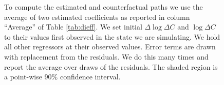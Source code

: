 \documentclass[11pt,reqno,letter]{amsart}
\theoremstyle{definition}
\begin{document}
\begin{figure}[h]
\begin{minipage}{\linewidth}
\begin{tabular}{ccc}
    \end{tabular}
    \begin{flushleft}
      \footnotesize To compute the estimated and counterfactual paths
      we use the average of two estimated coefficients as reported in
      column ``Average'' of Table \ref{tab:dieff}. We set initial
      $\Delta \log \Delta C$ and $\log \Delta C$ to their values first
      observed in the state we are simulating. We hold all other
      regressors at their observed values. Error terms are drawn with
      replacement from the residuals. We do this many times and report
      the average over draws of the residuals. The shaded region is a
      point-wise 90\% confidence interval.
    \end{flushleft}
  \end{minipage}
\end{figure}
\end{document}
